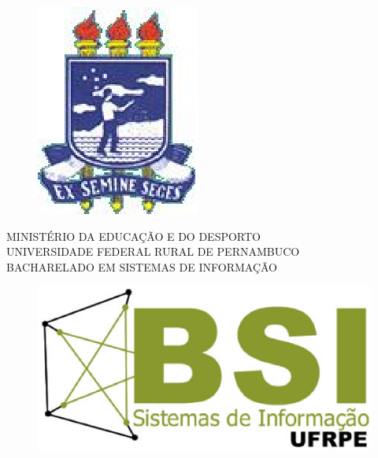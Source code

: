 \documentclass[a4paper,11pt]{article}
\begin{document}
\pagestyle {empty}


\vspace*{-2cm}
\begin{figure}[h]
\leavevmode
\begin{minipage}[t]{\textwidth}
\includegraphics[scale=0.7]{images/logo-ufrpe.eps}
\end{minipage}
\end{figure}
\vspace*{-3.0cm}
{\bf
\begin{center}
{
\hspace*{0cm} 	MINISTÉRIO DA EDUCAÇÃO E DO DESPORTO \\
\hspace*{.2in} UNIVERSIDADE FEDERAL RURAL DE PERNAMBUCO \\
\hspace*{.2in} BACHARELADO EM SISTEMAS DE INFORMAÇÃO} \\
\end{center}}
\vspace{0.0cm}
\noindent
\begin{figure}[h]
\centering
\includegraphics[scale=0.5]{images/Logo-bsi-presencial-v3-amp.eps}
\end{figure}
\vspace*{2.0cm}
\end{document}
